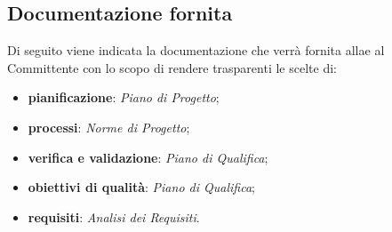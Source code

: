\subsection{Documentazione fornita}
\label{Documentazione fornita}
Di seguito viene indicata la documentazione che verrà fornita allae al Committente con lo scopo di rendere trasparenti le scelte di:
\begin{itemize}
	\item \textbf{pianificazione}: \textit{Piano di Progetto};
	\item \textbf{processi}: \textit{Norme di Progetto};
	\item \textbf{verifica e validazione}: \textit{Piano di Qualifica};
	\item \textbf{obiettivi di qualità}: \textit{Piano di Qualifica};
	\item \textbf{requisiti}: \textit{Analisi dei Requisiti}.
\end{itemize}

